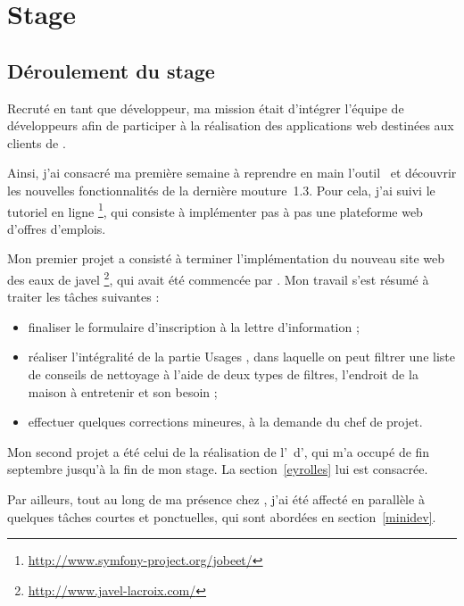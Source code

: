 \chapter{Stage}

\section{Déroulement du stage}

Recruté en tant que développeur, ma mission était d'intégrer l'équipe de développeurs afin de participer à la réalisation des applications web destinées aux clients de \asl.

Ainsi, j'ai consacré ma première semaine à reprendre en main l'outil \asf\ et découvrir les nouvelles fonctionnalités de la dernière mouture~1.3. Pour cela, j'ai suivi le tutoriel en ligne \ajobeet\footnote{\url{http://www.symfony-project.org/jobeet/}}, qui consiste à implémenter pas à pas une plateforme web d'offres d'emplois.

Mon premier projet a consisté à terminer l'implémentation du nouveau site web des eaux de javel \alc\footnote{\url{http://www.javel-lacroix.com/}}, qui avait été commencée par \abriand. Mon travail s'est résumé à traiter les tâches suivantes :

\begin{itemize}
	\item finaliser le formulaire d'inscription à la lettre d'information ;
	\item réaliser l'intégralité de la partie \og Usages \fg, dans laquelle on peut filtrer une liste de conseils de nettoyage à l'aide de deux types de filtres, l'endroit de la maison à entretenir et son besoin ;
	\item effectuer quelques corrections mineures, à la demande du chef de projet.
\end{itemize}

Mon second projet a été celui de la réalisation de l'\aintranet\ d'\aey, qui m'a occupé de fin septembre jusqu'à la fin de mon stage. La section~\ref{eyrolles} lui est consacrée.

Par ailleurs, tout au long de ma présence chez \asl, j'ai été affecté en parallèle à quelques tâches courtes et ponctuelles, qui sont abordées en section~\ref{minidev}.









